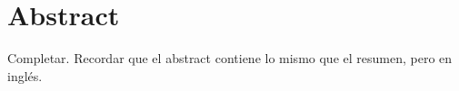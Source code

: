 \chapter*{Abstract}

Completar. Recordar que el abstract contiene lo mismo que el resumen, pero en inglés.